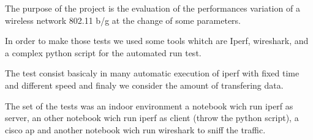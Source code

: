 
The purpose of the project is the evaluation of the performances variation of a wireless network 802.11 b/g at the change of some parameters.

In order to make those tests we used some tools whitch are Iperf, wireshark, and a complex python script for the automated run test.

The test consist basicaly in many automatic execution of iperf with fixed time and different speed and finaly we consider the amount of transfering data.

The set of the tests was an indoor environment a notebook wich run iperf as server, an other notebook wich run iperf as client (throw the python script), a cisco ap and another notebook wich run wireshark to sniff the traffic.